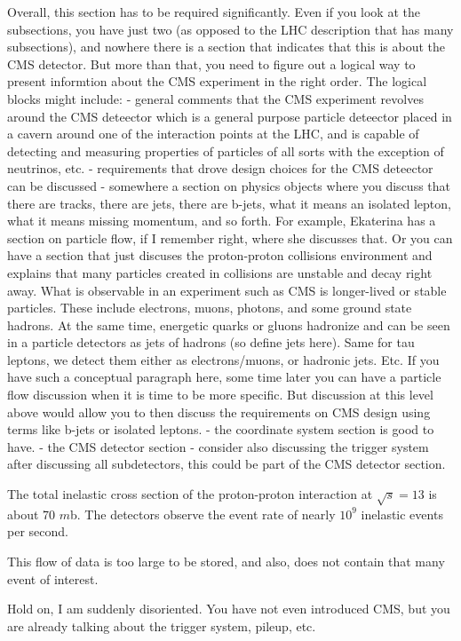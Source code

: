 Overall, this section has to be required significantly. 
   Even if you look at the subsections, you have just two (as opposed to the LHC  description that has many subsections), and nowhere there is a section that indicates that this is about the CMS detector.
   But more than that, you need to figure out a logical way to present informtion about the CMS experiment in the right order. The logical blocks might include:
  - general comments that the CMS experiment revolves around the CMS deteector which is a general purpose particle deteector placed in a cavern around one of the interaction points at the LHC, and is capable of detecting and measuring properties of particles of all sorts with the exception of neutrinos, etc.
  - requirements that drove design choices for the CMS deteector can be discussed
  - somewhere a section on physics objects where you discuss that there are tracks, there are jets, there are b-jets, what it means an isolated lepton, what it means missing momentum, and so forth. For example, Ekaterina has a section on particle flow, if I remember right, where she discusses that. Or you can have a section that just discuses the proton-proton collisions environment and explains that many particles created in collisions are unstable and decay right away. What is observable in an experiment such as CMS is longer-lived or stable particles. These include electrons, muons, photons, and some ground state hadrons. At the same time, energetic quarks or gluons hadronize and can be seen in a particle detectors as jets of hadrons (so define jets here). Same for tau leptons, we detect them either as electrons/muons, or hadronic jets. Etc. If you have such a conceptual paragraph here, some time later you can have a particle flow discussion when it is time to be more specific. But discussion at this level above would allow you to then discuss the requirements on CMS design using terms like b-jets or isolated leptons.
  - the coordinate system section is good to have.
  - the CMS detector section
  - consider also discussing the trigger system after discussing all subdetectors, this could be part of the CMS detector section. 
  
  
The total inelastic cross section of the proton-proton interaction at $\sqrt{s}=13$ is about 70 $m$b. The detectors observe the event rate of nearly $10^{9}$ inelastic events per second.

This flow of data is too large to be stored, and also, does not contain that many event of interest.
 
 
 Hold on, I am suddenly disoriented. You have not even introduced CMS, but you are already talking about the trigger system, pileup, etc.

